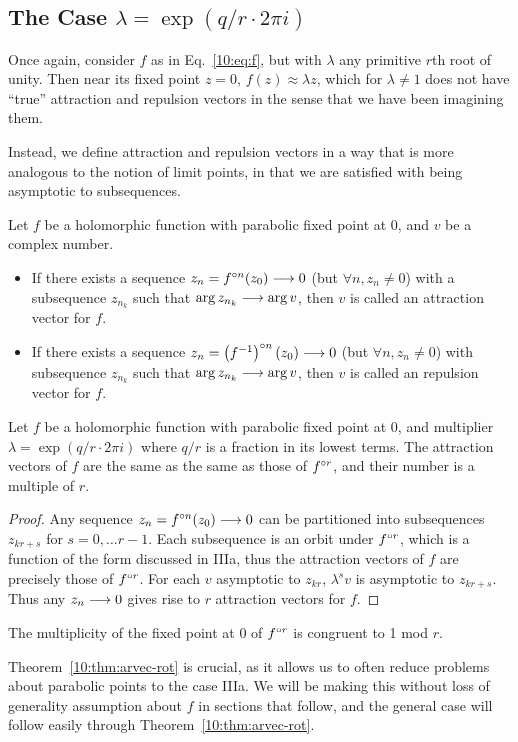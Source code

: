 \documentclass[../main.tex]{subfiles}
\begin{document}
\subsection{The Case $\lambda = \exp(q/r \cdot 2\pi i)$}
Once again, consider $f$ as in Eq.~\ref{10:eq:f}, but with $\lambda$ any primitive $r$th root of unity. Then near its fixed point $z=0$, $f(z)\approx \lambda z$, which for $\lambda\ne 1$ does not have ``true'' attraction and repulsion vectors in the sense that we have been imagining them. 

Instead, we define attraction and repulsion vectors in a way that is more analogous to the notion of limit points, in that we are satisfied with being asymptotic to subsequences.

\begin{dfn}
   Let $f$ be a holomorphic function with parabolic fixed point at 0, and $v$ be a complex number.
    \begin{itemize}
        \item If there exists a sequence $z_n=f^{\circ n}(z_0)\longrightarrow 0$ (but $\forall n, z_n\ne 0$) with a subsequence $z_{n_k}$ such that $\arg z_{n_k}\longrightarrow\arg v$, then $v$ is called an attraction vector for $f$.
        \item If there exists a sequence $z_n=\left(f^{-1}\right)^{\circ n}(z_0)\longrightarrow 0$ (but $\forall n, z_n\ne 0$) with subsequence $z_{n_k}$ such that $\arg z_{n_k}\longrightarrow\arg v$, then $v$ is called an repulsion vector for $f$.
    \end{itemize}
\end{dfn}
\begin{thm}
    \label{10:thm:arvec-rot}    
    Let $f$ be a holomorphic function with parabolic fixed point at 0, and multiplier $\lambda=\exp(q/r\cdot 2\pi i)$ where $q/r$ is a fraction in its lowest terms. The attraction vectors of $f$ are the same as the same as those of $f^{\circ r}$, and their number is a multiple of $r$.
\end{thm}
\begin{proof}
    Any sequence $z_n=f^{\circ n}(z_0)\longrightarrow 0$ can be partitioned into subsequences $z_{kr+s}$ for $s=0,\dots r-1$. Each subsequence is an orbit under $f^{\circ r}$, which is a function of the form discussed in IIIa, thus the attraction vectors of $f$ are precisely those of $f^{\circ r}$. For each $v$ asymptotic to $z_{kr}$, $\lambda^s v$ is asymptotic to $z_{kr+s}$. Thus any $z_n\longrightarrow 0$ gives rise to $r$ attraction vectors for $f$. 
\end{proof}
\begin{cor}
    \label{10:thm:rot-mult}
    The multiplicity of the fixed point at 0 of $f^{\circ r}$ is congruent to 1 mod $r$. 
\end{cor}
Theorem~\ref{10:thm:arvec-rot} is crucial, as it allows us to often reduce problems about parabolic points to the case IIIa. We will be making this without loss of generality assumption about $f$ in sections that follow, and the general case will follow easily through Theorem~\ref{10:thm:arvec-rot}.
\end{document}
